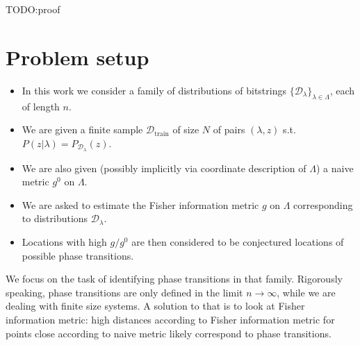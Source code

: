\documentclass[american,aps,pra,reprint,floatfix,nofootinbib,superscriptaddress]{revtex4-2}
\begin{document}
TODO:proof

\section{Problem setup}
\begin{itemize}
  \item In this work we consider a family of distributions of
bitstrings $\{\mathcal{D}_{\lambda}\}_{\lambda \in \Lambda}$, each of length $n$.
  \item We are given a finite sample $\mathcal{D}_{\textrm{train}}$ of size $N$
  of pairs $(\lambda, z)$ s.t. $P(z|\lambda) = P_{\mathcal{D}_{\lambda}}(z)$.
  \item We are also given (possibly implicitly via coordinate description of $\Lambda$) a naive metric $g^0$ on $\Lambda$.
  \item We are asked to estimate the Fisher information metric $g$ on $\Lambda$ corresponding to distributions $\mathcal{D}_{\lambda}$.
  \item Locations with high $g / g^0$ are then considered to be conjectured locations of possible phase transitions.
\end{itemize}

We focus on the task of identifying phase transitions in that
family. Rigorously speaking, phase transitions are only defined
in the limit $n\to\infty$, while we are dealing with finite size systems.
A solution to that is to look at Fisher information metric: high distances according to Fisher information metric for points close according to naive metric likely correspond to phase transitions.
\end{document}
